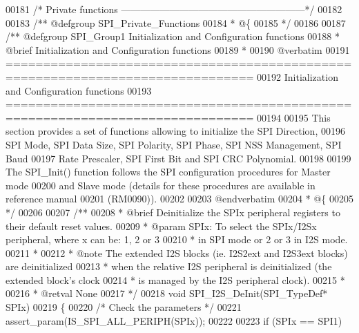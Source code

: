\begin{DoxyCode}
00181 \textcolor{comment}{/* Private functions ---------------------------------------------------------*/}
00182 
00183 \textcolor{comment}{/** @defgroup SPI\_Private\_Functions}
00184 \textcolor{comment}{  * @\{}
00185 \textcolor{comment}{  */}
00186 
00187 \textcolor{comment}{/** @defgroup SPI\_Group1 Initialization and Configuration functions}
00188 \textcolor{comment}{ *  @brief   Initialization and Configuration functions }
00189 \textcolor{comment}{ *}
00190 \textcolor{comment}{@verbatim   }
00191 \textcolor{comment}{ ===============================================================================}
00192 \textcolor{comment}{                  Initialization and Configuration functions}
00193 \textcolor{comment}{ ===============================================================================  }
00194 \textcolor{comment}{}
00195 \textcolor{comment}{  This section provides a set of functions allowing to initialize the SPI Direction,}
00196 \textcolor{comment}{  SPI Mode, SPI Data Size, SPI Polarity, SPI Phase, SPI NSS Management, SPI Baud}
00197 \textcolor{comment}{  Rate Prescaler, SPI First Bit and SPI CRC Polynomial.}
00198 \textcolor{comment}{  }
00199 \textcolor{comment}{  The SPI\_Init() function follows the SPI configuration procedures for Master mode}
00200 \textcolor{comment}{  and Slave mode (details for these procedures are available in reference manual}
00201 \textcolor{comment}{  (RM0090)).}
00202 \textcolor{comment}{  }
00203 \textcolor{comment}{@endverbatim}
00204 \textcolor{comment}{  * @\{}
00205 \textcolor{comment}{  */}
00206 
00207 \textcolor{comment}{/**}
00208 \textcolor{comment}{  * @brief  Deinitialize the SPIx peripheral registers to their default reset values.}
00209 \textcolor{comment}{  * @param  SPIx: To select the SPIx/I2Sx peripheral, where x can be: 1, 2 or 3 }
00210 \textcolor{comment}{  *         in SPI mode or 2 or 3 in I2S mode.   }
00211 \textcolor{comment}{  *         }
00212 \textcolor{comment}{  * @note   The extended I2S blocks (ie. I2S2ext and I2S3ext blocks) are deinitialized}
00213 \textcolor{comment}{  *         when the relative I2S peripheral is deinitialized (the extended block's clock}
00214 \textcolor{comment}{  *         is managed by the I2S peripheral clock).}
00215 \textcolor{comment}{  *             }
00216 \textcolor{comment}{  * @retval None}
00217 \textcolor{comment}{  */}
00218 \textcolor{keywordtype}{void} SPI_I2S_DeInit(SPI\_TypeDef* SPIx)
00219 \{
00220   \textcolor{comment}{/* Check the parameters */}
00221   assert_param(IS\_SPI\_ALL\_PERIPH(SPIx));
00222 
00223   \textcolor{keywordflow}{if} (SPIx == SPI1)

\end{DoxyCode}
